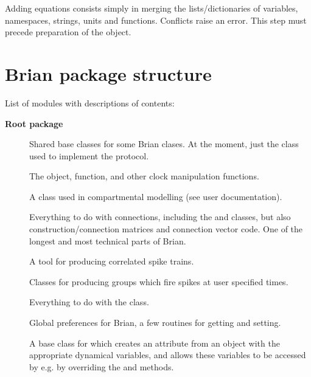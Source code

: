 \documentclass[letterpaper,10pt,english]{manual}
\begin{document}
Adding equations consists simply in merging the lists/dictionaries of variables, namespaces, strings, units
and functions. Conflicts raise an error.
This step must precede preparation of the object.

\resetcurrentobjects
\hypertarget{--doc-developer-packagestructure}{}

\section{Brian package structure}

List of modules with descriptions of contents:

\textbf{Root package}
\begin{description}
\item[] \leavevmode
Shared base classes for some Brian clases. At the moment, just the
 class used to implement the 
protocol.

\item[] \leavevmode
The  object,  function, and other clock
manipulation functions.

\item[] \leavevmode
A class used in compartmental modelling (see user documentation).

\item[] \leavevmode
Everything to do with connections, including the  and
 classes, but also construction/connection matrices
and connection vector code. One of the longest and most technical parts of
Brian.

\item[] \leavevmode
A tool for producing correlated spike trains.

\item[] \leavevmode
Classes for producing groups which fire spikes at user specified times.

\item[] \leavevmode
Everything to do with the  class.

\item[] \leavevmode
Global preferences for Brian, a few routines for getting and setting.

\item[] \leavevmode
A base class for  which creates an  attribute from
an  object with the appropriate dynamical variables, and
allows these variables to be accessed by e.g.  by overriding the
 and  methods.


\end{description}
\end{document}
